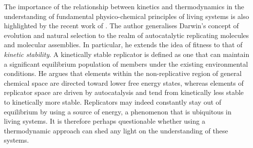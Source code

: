 The importance of the relationship
between kinetics and thermodynamics
in the understanding of fundamental
physico-chemical principles of living systems
is also highlighted by the recent work of \citet{pross}.
The author generalises Darwin's concept of evolution
and natural selection to the realm of autocatalytic
replicating molecules and molecular assemblies.
In particular, he extends the idea of fitness
to that of \emph{kinetic stability}.
A kinetically stable replicator is defined as
one that can maintain a significant equilibrium population
of members under the existing environmental conditions.
He argues that elements within the non-replicative region
of general chemical space are directed toward lower free energy states,
whereas elements of replicator space are driven by autocatalysis
and tend from kinetically less stable to kinetically more stable.
Replicators may indeed constantly stay out of equilibrium
by using a source of energy,
a phenomenon that is ubiquitous in living systems.
It is therefore perhaps questionable
whether using a thermodynamic approach
can shed any light on the understanding of these systems.
\fi





